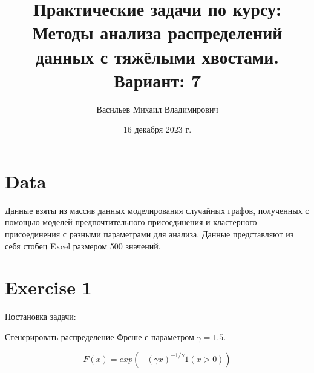 \documentclass[reprint, amsmath, amssymb, aps,]{revtex4-2}
\begin{document}
\title{Практические задачи по курсу: Методы анализа распределений данных с тяжёлыми хвостами. Вариант: 7}



\author{Васильев Михаил Владимирович}
%


\date{16 декабря 2023 г.}%
             


\maketitle

\section{Data}
Данные взяты из массив данных моделирования случайных графов, полученных с помощью моделей предпочтительного присоединения и кластерного присоединения с разными параметрами для анализа. Данные представляют из себя стобец Excel размером 500 значений. 


\section{Exercise 1}
Постановка задачи:

Сгенерировать распределение Фреше с параметром $\gamma = 1.5$.


\begin{equation} \label{Функция распределения Фреше}
F(x) = exp(-(\gamma x)^{-1/\gamma} 1(x>0))
\end{equation}
\end{document}
